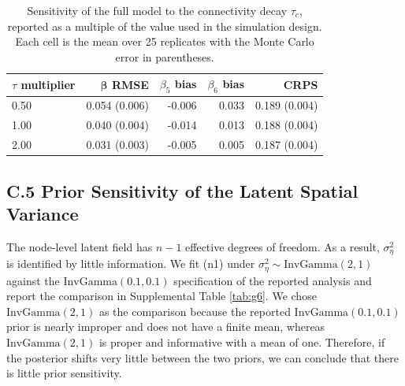 \documentclass{article}
\begin{document}
\begin{table}
\caption{Sensitivity of the full model to the connectivity decay $\tau_c$, reported as a multiple of the value used in the simulation design. Each cell is the mean over 25 replicates with the Monte Carlo error in parentheses.}
\label{tab:sim-tau}
\centering\small\begin{tabular}{lrrrr}
\toprule
$\tau$ multiplier & $\boldsymbol{\beta}$ RMSE & $\beta_5$ bias & $\beta_6$ bias & CRPS \\
\midrule
0.50 & 0.054 (0.006) & -0.006 & 0.033 & 0.189 (0.004) \\
1.00 & 0.040 (0.004) & -0.014 & 0.013 & 0.188 (0.004) \\
2.00 & 0.031 (0.003) & -0.005 & 0.005 & 0.187 (0.004) \\
\bottomrule\end{tabular}\end{table}
 
\subsection*{C.5 Prior Sensitivity of the Latent Spatial Variance}
 
The node-level latent field has $n-1$ effective degrees of freedom. As a result,
$\sigma^2_\eta$ is identified by little information. We fit (n1) under $\sigma^2_\eta\sim\text{InvGamma}(2,1)$ against the
$\text{InvGamma}(0.1,0.1)$ specification of the reported analysis and report the comparison in Supplemental Table \ref{tab:g6}. We chose $\text{InvGamma}(2,1)$ as the comparison because the reported $\text{InvGamma}(0.1,0.1)$ prior is nearly improper and does not have a finite mean, whereas $\text{InvGamma}(2,1)$ is proper and informative with a mean of one. Therefore, if the posterior shifts very little between the two priors, we can conclude that there is little prior sensitivity.
 
\end{document}
